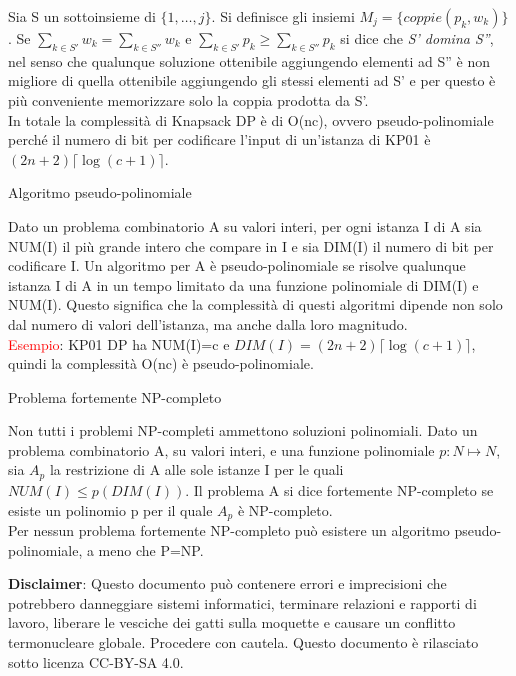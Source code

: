 \documentclass[answers, a4paper, 11pt]{exam}
\begin{document}
\begin{questions}
\begin{solution}
Sia S un sottoinsieme di $\{1, \ldots, j \}$. Si definisce gli insiemi $M_{j} = \{ coppie (p_{k}, w_{k}) \}$. Se $\sum_{k \in S'} w_{k} = \sum_{k \in S''} w_{k}$ e $\sum_{k \in S'} p_{k} \ge \sum_{k \in S''} p_{k}$ si dice che \emph{S' domina S''}, nel senso che qualunque soluzione ottenibile aggiungendo elementi ad S'' è non migliore di quella ottenibile aggiungendo gli stessi elementi ad S' e per questo è più conveniente memorizzare solo la coppia prodotta da S'.\\
In totale la complessità di Knapsack DP è di O(nc), ovvero pseudo-polinomiale perché il numero di bit per codificare l'input di un'istanza di KP01 è $(2n+2) \lceil \log(c+1) \rceil$.
\end{solution}
\question Algoritmo pseudo-polinomiale
\begin{solution}
Dato un problema combinatorio A su valori interi, per ogni istanza I di A sia NUM(I) il più grande intero che compare in I e sia DIM(I) il numero di bit per codificare I. Un algoritmo per A è pseudo-polinomiale se risolve qualunque istanza I di A in un tempo limitato da una funzione polinomiale di DIM(I) e NUM(I). Questo significa che la complessità di questi algoritmi dipende non solo dal numero di valori dell'istanza, ma anche dalla loro magnitudo.\\
\textcolor{red}{Esempio}: KP01 DP ha NUM(I)=c e $ DIM(I) = (2n+2) \lceil \log(c+1) \rceil$, quindi la complessità O(nc) è pseudo-polinomiale.
\end{solution}
\question Problema fortemente NP-completo
\begin{solution}
Non tutti i problemi NP-completi ammettono soluzioni polinomiali. Dato un problema combinatorio A, su valori interi, e una funzione polinomiale $p: N \mapsto N$, sia $A_{p}$ la restrizione di A alle sole istanze I per le quali $NUM(I) \le p(DIM(I))$. Il problema A si dice fortemente NP-completo se esiste un polinomio p per il quale $A_{p}$ è NP-completo.\\
Per nessun problema fortemente NP-completo può esistere un algoritmo pseudo-polinomiale, a meno che P=NP. 
\end{solution}

\end{questions}

\textbf{Disclaimer}:  Questo documento può contenere errori e imprecisioni che potrebbero danneggiare sistemi informatici, terminare relazioni e rapporti di lavoro, liberare le vesciche dei gatti sulla moquette e causare un conflitto termonucleare globale.
Procedere con cautela.
Questo documento è rilasciato sotto licenza CC-BY-SA 4.0. \ccbysa
\end{document}
